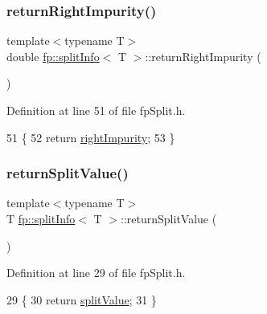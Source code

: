\subsubsection{\texorpdfstring{return\+Right\+Impurity()}{returnRightImpurity()}}
{\footnotesize\ttfamily template$<$typename T$>$ \\
double \hyperlink{classfp_1_1splitInfo}{fp\+::split\+Info}$<$ T $>$\+::return\+Right\+Impurity (\begin{DoxyParamCaption}{ }\end{DoxyParamCaption})\hspace{0.3cm}{\ttfamily [inline]}}



Definition at line 51 of file fp\+Split.\+h.


\begin{DoxyCode}
51                                                    \{
52                     \textcolor{keywordflow}{return} \hyperlink{classfp_1_1splitInfo_ac70a7dadd873d5bb1535fb0e5bea45fc}{rightImpurity};
53 \}
\end{DoxyCode}
\mbox{\label{classfp_1_1splitInfo_a7737702d3a91cca2ca82576ab4ff7b03}} 
\subsubsection{\texorpdfstring{return\+Split\+Value()}{returnSplitValue()}}
{\footnotesize\ttfamily template$<$typename T$>$ \\
T \hyperlink{classfp_1_1splitInfo}{fp\+::split\+Info}$<$ T $>$\+::return\+Split\+Value (\begin{DoxyParamCaption}{ }\end{DoxyParamCaption})\hspace{0.3cm}{\ttfamily [inline]}}



Definition at line 29 of file fp\+Split.\+h.


\begin{DoxyCode}
29                                            \{
30                     \textcolor{keywordflow}{return} \hyperlink{classfp_1_1splitInfo_a38374c82d5d58eafebb71b7aea024147}{splitValue};
31                 \}
\end{DoxyCode}
\mbox{\label{classfp_1_1splitInfo_a3db044a5d9500312ea1b006c3dd1387c}} 
